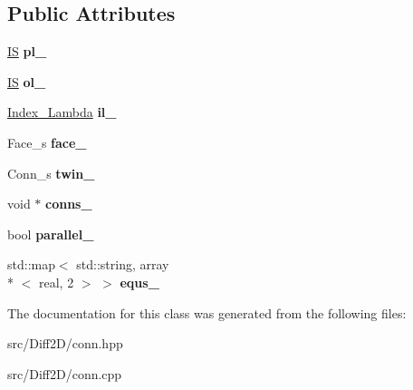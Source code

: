 \subsection*{Public Attributes}
\begin{DoxyCompactItemize}
\item 
\hypertarget{classConn_a61c9d519b93b91a14b4cc47a8cb8980b}{\hyperlink{structIS}{I\-S} {\bfseries pl\-\_\-}}\label{classConn_a61c9d519b93b91a14b4cc47a8cb8980b}

\item 
\hypertarget{classConn_a949773005bd6449b09e355e8f78dee47}{\hyperlink{structIS}{I\-S} {\bfseries ol\-\_\-}}\label{classConn_a949773005bd6449b09e355e8f78dee47}

\item 
\hypertarget{classConn_a659caee9d9a125f24d7eb054ca2e5879}{\hyperlink{structIndex__Lambda}{Index\-\_\-\-Lambda} {\bfseries il\-\_\-}}\label{classConn_a659caee9d9a125f24d7eb054ca2e5879}

\item 
\hypertarget{classConn_a893abc608e559f12c5368edbd6da7b54}{Face\-\_\-s {\bfseries face\-\_\-}}\label{classConn_a893abc608e559f12c5368edbd6da7b54}

\item 
\hypertarget{classConn_a7578b2f58e208173f45436d7261271a0}{Conn\-\_\-s {\bfseries twin\-\_\-}}\label{classConn_a7578b2f58e208173f45436d7261271a0}

\item 
\hypertarget{classConn_ac571dea0fa3d37ed022872da32ad6c33}{void $\ast$ {\bfseries conns\-\_\-}}\label{classConn_ac571dea0fa3d37ed022872da32ad6c33}

\item 
\hypertarget{classConn_aae3bc6691f2e065bf44e8f1a2cd4e31f}{bool {\bfseries parallel\-\_\-}}\label{classConn_aae3bc6691f2e065bf44e8f1a2cd4e31f}

\item 
\hypertarget{classConn_a445b27273bf4f8eb45f22739736fb66c}{std\-::map$<$ std\-::string, array\\*
$<$ real, 2 $>$ $>$ {\bfseries equs\-\_\-}}\label{classConn_a445b27273bf4f8eb45f22739736fb66c}

\end{DoxyCompactItemize}


The documentation for this class was generated from the following files\-:\begin{DoxyCompactItemize}
\item 
src/\-Diff2\-D/conn.\-hpp\item 
src/\-Diff2\-D/conn.\-cpp\end{DoxyCompactItemize}

